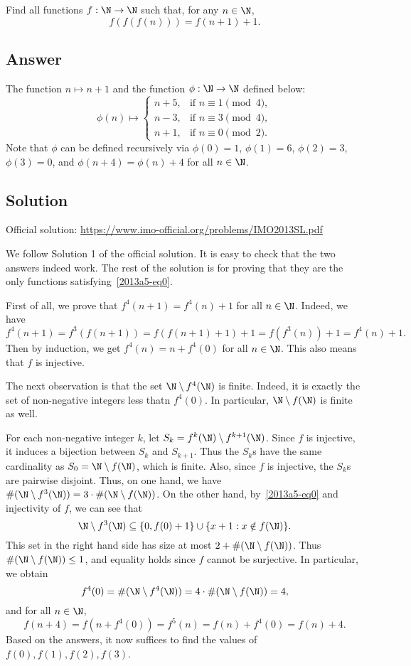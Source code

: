 Find all functions $f : \N \to \N$ such that, for any $n \in \N$,
\[ f(f(f(n))) = f(n + 1) + 1. \tag{*}\label{2013a5-eq0} \]



\subsection*{Answer}

The function $n \mapsto n + 1$ and the function $\phi : \N \to \N$ defined below:
\[ \phi(n) \mapsto \begin{cases}
    n + 5, & \text{if } n \equiv 1 \pmod{4}, \\
    n - 3, & \text{if } n \equiv 3 \pmod{4}, \\
    n + 1, & \text{if } n \equiv 0 \pmod{2}.
\end{cases} \]
Note that $\phi$ can be defined recursively via $\phi(0) = 1$, $\phi(1) = 6$, $\phi(2) = 3$, $\phi(3) = 0$, and $\phi(n + 4) = \phi(n) + 4$ for all $n \in \N$.



\subsection*{Solution}

Official solution: \url{https://www.imo-official.org/problems/IMO2013SL.pdf}

We follow Solution 1 of the official solution.
It is easy to check that the two answers indeed work.
The rest of the solution is for proving that they are the only functions satisfying~\eqref{2013a5-eq0}.

First of all, we prove that $f^4(n + 1) = f^4(n) + 1$ for all $n \in \N$.
Indeed, we have
\[ f^4(n + 1) = f^3(f(n + 1)) = f(f(n + 1) + 1) + 1 = f(f^3(n)) + 1 = f^4(n) + 1. \]
Then by induction, we get $f^4(n) = n + f^4(0)$ for all $n \in \N$.
This also means that $f$ is injective.

The next observation is that the set $\N \setminus f^4(\N)$ is finite.
Indeed, it is exactly the set of non-negative integers less thatn $f^4(0)$.
In particular, $\N \setminus f(\N)$ is finite as well.

For each non-negative integer $k$, let $S_k = f^k(\N) \setminus f^{k + 1}(\N)$.
Since $f$ is injective, it induces a bijection between $S_k$ and $S_{k + 1}$.
Thus the $S_k$s have the same cardinality as $S_0 = \N \setminus f(\N)$, which is finite.
Also, since $f$ is injective, the $S_k$s are pairwise disjoint.
Thus, on one hand, we have $\#(\N \setminus f^3(\N)) = 3 \cdot \#(\N \setminus f(\N))$.
On the other hand, by~\eqref{2013a5-eq0} and injectivity of $f$, we can see that
\[ \N \setminus f^3(\N) \subseteq \{0, f(0) + 1\} \cup \{x + 1 : x \notin f(\N)\}. \]
This set in the right hand side has size at most $2 + \#(\N \setminus f(\N))$.
Thus $\#(\N \setminus f(\N)) \leq 1$, and equality holds since $f$ cannot be surjective.
In particular, we obtain
\[ f^4(0) = \#(\N \setminus f^4(\N)) = 4 \cdot \#(\N \setminus f(\N)) = 4, \]
    and for all $n \in \N$,
\[ f(n + 4) = f(n + f^4(0)) = f^5(n) = f(n) + f^4(0) = f(n) + 4. \tag{1}\label{2013a5-eq1} \]
Based on the answers, it now suffices to find the values of $f(0), f(1), f(2), f(3)$.

